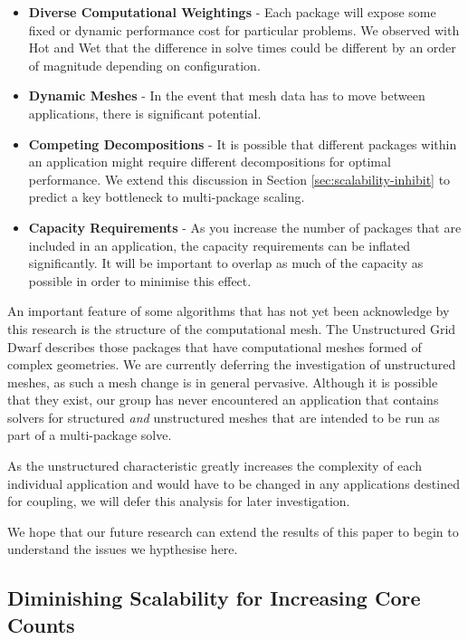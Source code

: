 \documentclass[runningheads,a4paper]{llncs}
\begin{document}
\begin{itemize}
  \item \textbf{Diverse Computational Weightings} - Each package will expose some fixed or dynamic performance cost for particular problems. We observed with Hot and Wet that the difference in solve times could be different by an order of magnitude depending on configuration.
  \item \textbf{Dynamic Meshes} - In the event that mesh data has to move between applications, there is significant potential.
  \item \textbf{Competing Decompositions} - It is possible that different packages within an application might require different decompositions for optimal performance. We extend this discussion in Section \ref{sec:scalability-inhibit} to predict a key bottleneck to multi-package scaling.
  \item \textbf{Capacity Requirements} - As you increase the number of packages that are included in an application, the capacity requirements can be inflated significantly. It will be important to overlap as much of the capacity as possible in order to minimise this effect.
\end{itemize}

An important feature of some algorithms that has not yet been acknowledge by this research is the structure of the computational mesh. The Unstructured Grid Dwarf describes those packages that have computational meshes formed of complex geometries. We are currently deferring the investigation of unstructured meshes, as such a mesh change is in general pervasive. Although it is possible that they exist, our group has never encountered an application that contains solvers for structured \textit{and} unstructured meshes that are intended to be run as part of a multi-package solve. 

As the unstructured characteristic greatly increases the complexity of each individual application and would have to be changed in any applications destined for coupling, we will defer this analysis for later investigation.

We hope that our future research can extend the results of this paper to begin to understand the issues we hypthesise here.

\subsection{Diminishing Scalability for Increasing Core Counts}
\end{document}
